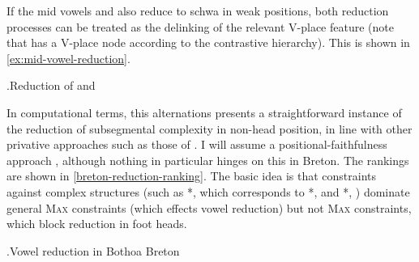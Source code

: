 If the mid vowels \ipa{[ɛ]} and \ipa{[ɔ]} also reduce to schwa in weak positions, both reduction processes can be treated as the delinking of the relevant V-place feature (note that \ipa{[ə]} has a V-place node according to the contrastive hierarchy). This is shown in \ref{ex:mid-vowel-reduction}.

\ex.\label{ex:mid-vowel-reduction}Reduction of \ipa{[ɛ]} and \ipa{[ɔ]}\\

In computational terms, this alternations presents a straightforward instance of the reduction of subsegmental complexity in non-head position, in line with other privative approaches such as those of \citet{harris97:_licen_inher,harris05:_vowel_reduction,harris-urua}. I will assume a positional\hyp faithfulness approach \citep[\egm][]{beckman,alderete1999,iosad10:_motiv}, although nothing in particular hinges on this in Breton. The rankings are shown in \ref{breton-reduction-ranking}. The basic idea is that constraints against complex structures (such as *, which corresponds to *\ipa{[æ]}, and *, \ie *\ipa{[ɒ]}) dominate general \textsc{Max} constraints (which effects vowel reduction) but not \textsc{Max}\hd{} constraints, which block reduction in foot heads.

\ex.\label{breton-reduction-ranking}Vowel reduction in Bothoa Breton\\

